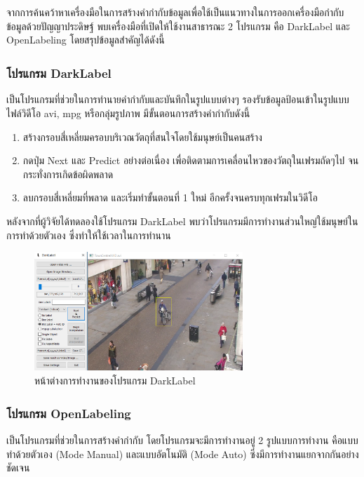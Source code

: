 จากการค้นคว้าหาเครื่องมือในการสร้างคำกำกับข้อมูลเพื่อใช้เป็นแนวทางในการออกเครื่องมือกำกับข้อมูลด้วยปัญญาประดิษฐ์ พบเครื่องมือที่เปิดให้ใช้งานสาธารณะ 2 โปรแกรม 
คือ DarkLabel และ OpenLabeling โดยสรุปข้อมูลสำคัญได้ดังนี้ 
\subsubsection*{โปรแกรม DarkLabel\textsuperscript{\cite{dark}}}
เป็นโปรแกรมที่ช่วยในการทำนายคำกำกับและบันทึกในรูปแบบต่างๆ รองรับข้อมูลป้อนเข้าในรูปแบบไฟล์วิดีโอ avi, mpg หรือกลุ่มรูปภาพ มีขั้นตอนการสร้างคำกำกับดังนี้ 
\begin{enumerate}
	\setlength\itemsep{-0.25em}
	\item สร้างกรอบสี่เหลี่ยมครอบบริเวณวัตถุที่สนใจโดยใช้มนุษย์เป็นคนสร้าง
	\item กดปุ่ม Next และ Predict อย่างต่อเนื่อง เพื่อติดตามการเคลื่อนไหวของวัตถุในเฟรมถัดๆไป จนกระทั่งการเกิดข้อผิดพลาด
	\item ลบกรอบสี่เหลี่ยมที่พลาด และเริ่มทำขั้นตอนที่ 1 ใหม่ อีกครั้งจนครบทุกเฟรมในวิดีโอ
\end{enumerate}

หลังจากที่ผู้วิจัยได้ทดลองใช้โปรแกรม DarkLabel พบว่าโปรแกรมมีการทำงานส่วนใหญ่ใช้มนุษย์ในการทำด้วยตัวเอง ซึ่งทำให้ใช้เวลาในการทำนาน

\begin{figure}[!ht]
	\centering
	\includegraphics[width=0.7\textwidth]{chapter2/images/darklabel.png}
		\caption{หน้าต่างการทำงานของโปรแกรม DarkLabel}
    	\label{fig:darklabel}
\end{figure}
\clearpage

\subsubsection*{โปรแกรม OpenLabeling\textsuperscript{\cite{open}}}
เป็นโปรแกรมที่ช่วยในการสร้างคำกำกับ โดยโปรแกรมจะมีการทำงานอยู่ 2 รูปแบบการทำงาน คือแบบทำด้วยตัวเอง (Mode Manual) และแบบอัตโนมัติ (Mode Auto) 
ซึ่งมีการทำงานแยกจากกันอย่างชัดเจน 

